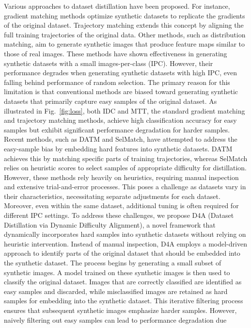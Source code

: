 \documentclass{article}
\theoremstyle{plain}
\theoremstyle{definition}
\theoremstyle{remark}
\begin{document}
Various approaches to dataset distillation have been proposed.
For instance, gradient matching methods optimize synthetic datasets to replicate the gradients
of the original dataset. Trajectory matching extends this concept by aligning the full
training trajectories of the original data. Other methods, such as distribution matching,
aim to generate synthetic images that produce feature maps similar to those of real images.
These methods have shown effectiveness in generating synthetic datasets with a small images-per-class (IPC).
However, their performance degrades when generating synthetic datasets with high IPC, even falling behind performance of random selection.
The primary reason for this limitation is that conventional methods are biased toward
generating synthetic datasets that primarily capture easy samples of the original dataset.
As illustrated in Fig.~\ref{fig:loss}, both IDC and MTT, the standard gradient matching and
trajectory matching methods, achieve high classification accuracy for easy samples but
exhibit significant performance degradation for harder samples.
Recent methods, such as DATM and SelMatch, have attempted to address the easy-sample bias by
embedding hard features into synthetic datasets. DATM achieves this by matching specific parts
of training trajectories, whereas SelMatch relies on heuristic scores to select
samples of appropriate difficulty for distillation.
However, these methods rely heavily on heuristics, requiring manual inspection and extensive
trial-and-error processes. This poses a challenge as datasets vary in their
characteristics, necessitating separate adjustments for each dataset. Moreover, even within
the same dataset, additional tuning is often required for different IPC settings.
To address these challenges, we propose D4A (Dataset Distillation via Dynamic Difficulty Alignment),
a novel framework that dynamically incorporates hard samples into synthetic datasets without
relying on heuristic intervention. Instead of manual inspection, D4A employs
a model-driven approach to identify parts of the original dataset that should be embedded
into the synthetic dataset.
The process begins by generating a small subset of synthetic images.
A model trained on these synthetic images is then used to classify the original dataset.
Images that are correctly classified are identified as easy samples and discarded,
while misclassified images are retained as hard samples for embedding into the synthetic dataset.
This iterative filtering process ensures that subsequent synthetic images emphasize harder samples.
However, naively filtering out easy samples can lead to performance degradation due
\end{document}
